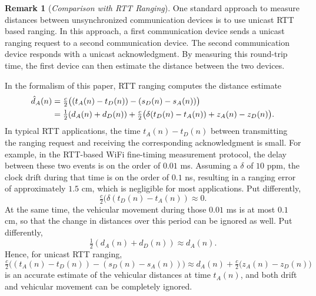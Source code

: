 \documentclass[12pt,journal,final,onecolumn]{IEEEtran}
\theoremstyle{definition}
\theoremstyle{myremark}
\newtheorem{remark}{Remark}
\begin{document}
\begin{remark}[\emph{Comparison with RTT Ranging}]
    One standard approach to measure distances between unsynchronized
    communication devices is to use unicast RTT based ranging.  In this
    approach, a first communication device sends a unicast ranging request to a
    second communication device. The second communication device responds with a
    unicast acknowledgment. By measuring this round-trip time, the first device
    can then estimate the distance between the two devices.

    In the formalism of this paper, RTT ranging computes the distance estimate
    \begin{align}
        \label{eq:rtt}
        \hat{d}_A(n) 
        & = \tfrac{c}{2}\bigl((t_A(n)-t_D(n))-(s_D(n)-s_A(n))\bigr) \\
        & = \tfrac{1}{2}(d_A(n)+d_D(n)) 
        +\tfrac{c}{2}\bigl(\delta(t_D(n)-t_A(n))+z_A(n)-z_D(n)\bigr). \notag
    \end{align}
    In typical RTT applications, the time $t_A(n)-t_D(n)$ between transmitting
    the ranging request and receiving the corresponding acknowledgment is small.
    For example, in the RTT-based WiFi fine-timing measurement protocol, the
    delay between these two events is on the order of $0.01$ ms. Assuming a
    $\delta$ of $10$ ppm, the clock drift during that time is on the order of
    $0.1$ ns, resulting in a ranging error of approximately $1.5$ cm, which is
    negligible for most applications. Put differently,
    \begin{equation*}
        \tfrac{c}{2}\bigl(\delta(t_D(n)-t_A(n)) \approx 0.
    \end{equation*}
    At the same time, the vehicular movement during those $0.01$ ms is at most
    $0.1$ cm, so that the change in distances over this period can be ignored
    as well. Put differently,
    \begin{equation*}
        \tfrac{1}{2}(d_A(n)+d_D(n)) \approx d_A(n).
    \end{equation*}
    Hence, for unicast RTT ranging,
    \begin{equation*}
        \tfrac{c}{2}\bigl((t_A(n)-t_D(n))-(s_D(n)-s_A(n))\bigr) 
        \approx d_A(n)+\tfrac{c}{2}\bigl(z_A(n)-z_D(n)\bigr)
    \end{equation*}
    is an accurate estimate of the vehicular distances at time $t_A(n)$, and
    both drift and vehicular movement can be completely ignored.


\end{remark}
\end{document}
